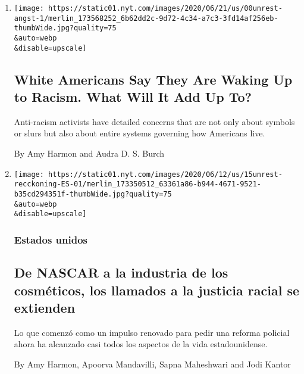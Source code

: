 \begin{enumerate}
\def\labelenumi{\arabic{enumi}.}
\item
  \href{/2020/06/22/us/racism-white-americans.html}{}

  \texttt{[image: https://static01.nyt.com/images/2020/06/21/us/00unrest-angst-1/merlin\_173568252\_6b62dd2c-9d72-4c34-a7c3-3fd14af256eb-thumbWide.jpg?quality=75\\\&auto=webp\\\&disable=upscale]}

  \hypertarget{white-americans-say-they-are-waking-up-to-racism-what-will-it-add-up-to}{%
  \subsection{White Americans Say They Are Waking Up to Racism. What
  Will It Add Up
  To?}\label{white-americans-say-they-are-waking-up-to-racism-what-will-it-add-up-to}}

  Anti-racism activists have detailed concerns that are not only about
  symbols or slurs but also about entire systems governing how Americans
  live.

  By Amy Harmon and Audra D. S. Burch
\item
  \href{/es/2020/06/15/espanol/mundo/racismo-george-floyd-protestas.html}{}

  \texttt{[image: https://static01.nyt.com/images/2020/06/12/us/15unrest-recckoning-ES-01/merlin\_173350512\_63361a86-b944-4671-9521-b35cd294351f-thumbWide.jpg?quality=75\\\&auto=webp\\\&disable=upscale]}

  \hypertarget{estados-unidos}{%
  \subsubsection{Estados unidos}\label{estados-unidos}}

  \hypertarget{de-nascar-a-la-industria-de-los-cosmuxe9ticos-los-llamados-a-la-justicia-racial-se-extienden}{%
  \subsection{De NASCAR a la industria de los cosméticos, los llamados a
  la justicia racial se
  extienden}\label{de-nascar-a-la-industria-de-los-cosmuxe9ticos-los-llamados-a-la-justicia-racial-se-extienden}}

  Lo que comenzó como un impulso renovado para pedir una reforma
  policial ahora ha alcanzado casi todos los aspectos de la vida
  estadounidense.

  By Amy Harmon, Apoorva Mandavilli, Sapna Maheshwari and Jodi Kantor


\end{enumerate}
